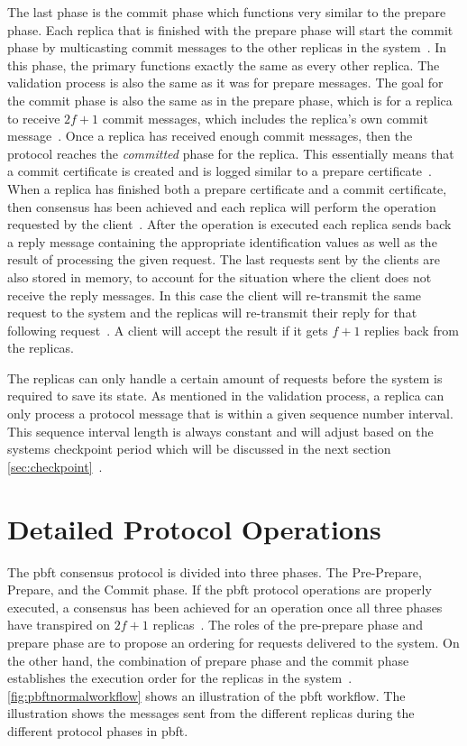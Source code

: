 The last phase is the commit phase which functions very similar to the prepare phase. Each replica that is finished with the prepare phase will start the commit phase by multicasting commit messages to the other replicas in the system~\cite[p.~4]{PAPER:OGPBFT}. In this phase, the primary functions exactly the same as every other replica. The validation process is also the same as it was for prepare messages. The goal for the commit phase is also the same as in the prepare phase, which is for a replica to receive $2f+1$ commit messages, which includes the replica's own commit message~\cite[p.~5]{PAPER:OGPBFT}. Once a replica has received enough commit messages, then the protocol reaches the \emph{committed} phase for the replica. This essentially means that a commit certificate is created and is logged similar to a prepare certificate~\cites[p.~409]{PAPER:PBFTRecovery}[p.~457]{BOOK:MVstandver3}. When a replica has finished both a prepare certificate and a commit certificate, then consensus has been achieved and each replica will perform the operation requested by the client~\cites[p.~409]{PAPER:PBFTRecovery}[p.~5]{PAPER:OGPBFT}. After the operation is executed each replica sends back a reply message containing the appropriate identification values as well as the result of processing the given request. The last requests sent by the clients are also stored in memory, to account for the situation where the client does not receive the reply messages. In this case the client will re-transmit the same request to the system and the replicas will re-transmit their reply for that following request~\cite[p.~409]{PAPER:PBFTRecovery}. A client will accept the result if it gets $f+1$ replies back from the replicas.
 

The replicas can only handle a certain amount of requests before the system is required to save its state. As mentioned in the validation process, a replica can only process a protocol message that is within a given sequence number interval. This sequence interval length is always constant and will adjust based on the systems checkpoint period which will be discussed in the next section \autoref{sec:checkpoint}~\cites[p.~262]{BOOK:BuildDepDistSyst}[p.~4-5]{PAPER:OGPBFT}.
\fi

\section{Detailed Protocol Operations}
\label{sec:detailedProtocol}
The \ac{pbft} consensus protocol is divided into three phases. The Pre-Prepare, Prepare, and the Commit phase. If the \ac{pbft} protocol operations are properly executed, a consensus has been achieved for an operation once all three phases have transpired on $2f+1$ replicas~\cites{WEB:ImpPBFTBlock}[p.~257-259]{BOOK:BuildDepDistSyst}. The roles of the pre-prepare phase and prepare phase are to propose an ordering for requests delivered to the system. On the other hand, the combination of prepare phase and the commit phase establishes the execution order for the replicas in the system~\cite[p.~4]{PAPER:OGPBFT}. \autoref{fig:pbftnormalworkflow} shows an illustration of the \ac{pbft} workflow. The illustration shows the messages sent from the different replicas during the different protocol phases in \ac{pbft}.

